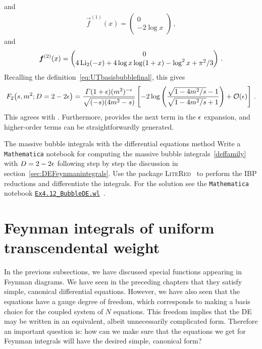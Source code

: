 and 
\begin{align}\label{solbubbleweight1}
\vec{f}^{(1)}(x) =  \begin{pmatrix}
0  \\
-2 \log x     
\end{pmatrix} \,,
\end{align}
and 
\begin{align} \label{solbubbleweight2}
\vec{f}^{(2)}(x) =  \begin{pmatrix}
0  \\
4 \, {\rm Li}_{2}(-x) +4 \log x \log(1+x) -\log^2 x+\pi^2/3 
\end{pmatrix} \,.
\end{align} 
Recalling the definition~\eqref{eq:UTbasisbubblefinal},
this gives
\begin{align}
F_{2}\bigl(s,m^2;D=2- 2\eps\bigr) = 
\frac{\Gamma(1+\eps) (m^2)^{-\eps}}{\sqrt{(-s)(4 m^2-s)}} \left[   
- 2  \log\left( \frac{\sqrt{1-4 m^2/s}-1}{ \sqrt{1-4 m^2/s} +1 } \right) + {\cal O}(\eps) 
  \right] \,.
\end{align}
This agrees with .
Furthermore,  provides the next term in the $\epsilon$ expansion, and higher-order terms can be straightforwardly generated.

\newpage

\begin{exer}{The massive bubble integrals with the differential equations method}
\label{Ex:4.BubbleDE}
Write a \texttt{Mathematica} notebook for computing the massive bubble integrals~\eqref{deffamily} with $D=2-2\epsilon$ following step by step the discussion in section~\ref{sec:DEFeynmanintegrals}.
Use the package \textsc{LiteRed}~\cite{ch4Lee:2012cn} to perform the IBP reductions and differentiate the integrals. 
For the solution see the \texttt{Mathematica} notebook \href{https://scattering-amplitudes.mpp.mpg.de/scattering-amplitudes-in-qft/Exercises/}{\tt Ex4.12\_BubbleDE.wl}~\cite{ch4website-ch4}.

\end{exer}





 
\section{Feynman integrals of uniform transcendental weight}
\label{sec:dlog}

In the previous subsections, we have discussed special functions appearing in Feynman diagrams.
We have seen in the preceding chapters that they satisfy simple, canonical differential equations. 
However, we have also seen that the equations have a gauge degree of freedom, which corresponds to making a basis choice for the coupled system of $N$ equations. This freedom implies that the DE may be written in an equivalent, albeit unnecessarily complicated form. Therefore an important question is: how can we make sure that the equations we get for Feynman integrals will have the desired simple, canonical form?

